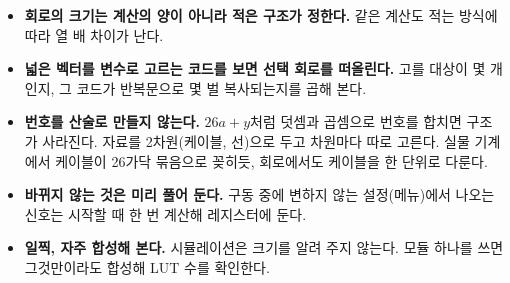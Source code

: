\begin{keybox}
\begin{itemize}
\item \textbf{회로의 크기는 계산의 양이 아니라 적은 구조가 정한다.} 같은 계산도 적는 방식에 따라 열 배
차이가 난다.
\item \textbf{넓은 벡터를 변수로 고르는 코드를 보면 선택 회로를 떠올린다.} 고를 대상이 몇 개인지, 그
코드가 반복문으로 몇 벌 복사되는지를 곱해 본다.
\item \textbf{번호를 산술로 만들지 않는다.} $26a + y$처럼 덧셈과 곱셈으로 번호를 합치면 구조가 사라진다.
자료를 2차원(케이블, 선)으로 두고 차원마다 따로 고른다. 실물 기계에서 케이블이 26가닥 묶음으로 꽂히듯,
회로에서도 케이블을 한 단위로 다룬다.
\item \textbf{바뀌지 않는 것은 미리 풀어 둔다.} 구동 중에 변하지 않는 설정(메뉴)에서 나오는 신호는 시작할
때 한 번 계산해 레지스터에 둔다.
\item \textbf{일찍, 자주 합성해 본다.} 시뮬레이션은 크기를 알려 주지 않는다. 모듈 하나를 쓰면 그것만이라도
합성해 LUT 수를 확인한다.
\end{itemize}
\end{keybox}
